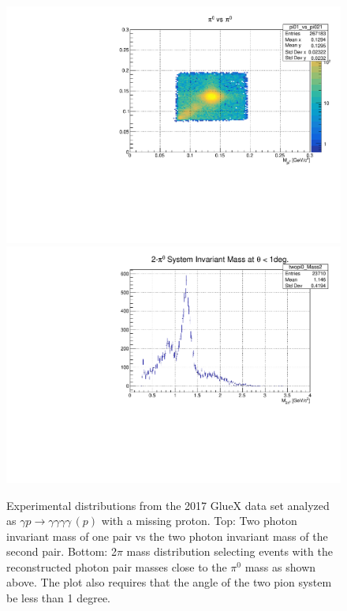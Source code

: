 \begin{figure}[tph] 
\centering
\includegraphics[width=4.75in]{figures/pi0VSpi0.pdf} \\
\centering
\includegraphics[width=4.75in]{figures/TwoPiInvMass.pdf}
\caption{Experimental distributions from the 2017 GlueX data set analyzed as $\gamma p\rightarrow \gamma \gamma \gamma \gamma\, (p)$ with a missing proton. Top: Two photon invariant mass of one pair vs the two photon invariant mass of the second pair. Bottom: 2$\pi$ mass distribution selecting events with the reconstructed photon pair masses close to the $\pi^0$ mass as  shown above. The plot also requires that the angle of the two pion system be less than 1 degree.
\label{fig:TwoPiInvMass}}
\end{figure}

